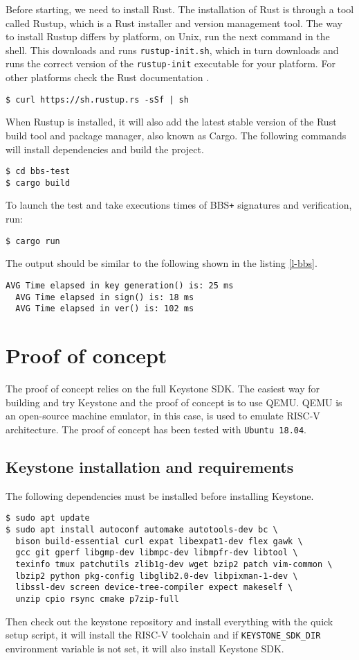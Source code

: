 Before starting, we need to install Rust. The installation of Rust is through a tool called Rustup, which is a Rust installer and version management tool. The way to install Rustup differs by platform, on Unix, run the next command in the shell. This downloads and runs \texttt{rustup-init.sh}, which in turn downloads and runs the correct version of the \texttt{rustup-init} executable for your platform. For other platforms check the Rust documentation \cite{rust-install}. 
\begin{lstlisting}[frame=single]
$ curl https://sh.rustup.rs -sSf | sh
\end{lstlisting}
When Rustup is installed, it will also add the latest stable version of the Rust build tool and package manager, also known as Cargo. The following commands will install dependencies and build the project. 
\begin{lstlisting}[frame=single]
$ cd bbs-test
$ cargo build
\end{lstlisting}
To launch the test and take executions times of BBS\texttt{+} signatures and verification, run:  
\begin{lstlisting}[frame=single]
$ cargo run
\end{lstlisting}

The output should be similar to the following shown in the listing \ref{l-bbs}. 
\begin{lstlisting}[caption={Example of BBS\texttt{+} tests output},captionpos=b,label={l-bbs},style=DOS,frame=single]
  AVG Time elapsed in key generation() is: 25 ms
  AVG Time elapsed in sign() is: 18 ms
  AVG Time elapsed in ver() is: 102 ms
\end{lstlisting}

\section{Proof of concept}

The proof of concept relies on the full Keystone SDK. The easiest way for building and try Keystone and the proof of concept is to use QEMU. QEMU is an open-source machine emulator, in this case, is used to emulate RISC-V architecture.
The proof of concept has been tested with \texttt{Ubuntu 18.04}. 
\subsection{Keystone installation and requirements}
The following dependencies must be installed before installing Keystone.
\begin{lstlisting}[frame=single]
$ sudo apt update
$ sudo apt install autoconf automake autotools-dev bc \
  bison build-essential curl expat libexpat1-dev flex gawk \ 
  gcc git gperf libgmp-dev libmpc-dev libmpfr-dev libtool \ 
  texinfo tmux patchutils zlib1g-dev wget bzip2 patch vim-common \
  lbzip2 python pkg-config libglib2.0-dev libpixman-1-dev \
  libssl-dev screen device-tree-compiler expect makeself \
  unzip cpio rsync cmake p7zip-full
\end{lstlisting}
Then check out the keystone repository and install everything with the quick setup script, it will install the RISC-V toolchain and if \texttt{KEYSTONE\_SDK\_DIR} environment variable is not set, it will also install Keystone SDK. 

